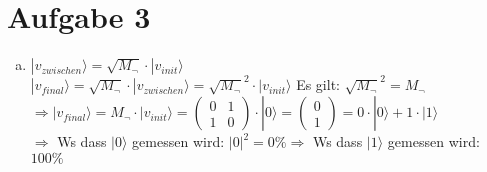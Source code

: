 \documentclass[a4paper]{scrartcl}
\begin{document}
\section*{Aufgabe 3}
\begin{enumerate}[a)]

\item $|v_{zwischen}\rangle=\sqrt{M_\neg}\cdot |v_{init}\rangle$\\
$|v_{final}\rangle=\sqrt{M_\neg}\cdot |v_{zwischen}\rangle= \sqrt{M_\neg}^2\cdot |v_{init}\rangle$ Es gilt: $\sqrt{M_\neg}^2=M_\neg$\\
$\Rightarrow |v_{final}\rangle=M_\neg\cdot |v_{init}\rangle= \begin{pmatrix}0 & 1\\1&0\end{pmatrix}\cdot |0\rangle= \begin{pmatrix}0\\1\end{pmatrix}= 0\cdot |0\rangle+1\cdot |1\rangle$\\
$\Rightarrow$ Ws dass $|0\rangle$ gemessen wird: $|0|^2=0\% \Rightarrow$ Ws dass $|1\rangle$ gemessen wird: $100\%$


\end{enumerate}
\end{document}
